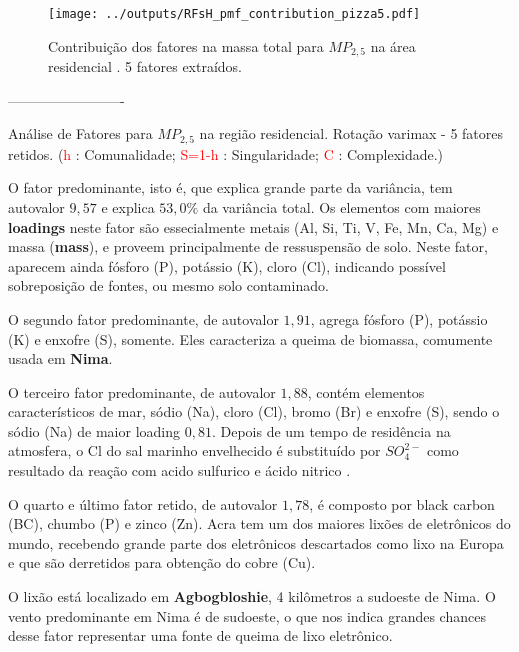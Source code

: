 \begin{figure}[H]
\centering
  \texttt{[image: ../outputs/RFsH\_pmf\_contribution\_pizza5.pdf]}
  \caption{Contribuição dos fatores na massa total para $MP_{2,5}$ na área
           residencial . 5 fatores extraídos.
          \label{table:RFsH_contribution5}}
\end{figure}

-------------------------

\begin{table}[H]
  \caption{Análise de Fatores para $MP_{2,5}$ na região residencial.
           Rotação varimax - 5 fatores retidos.
           (\textcolor{red}{h} : Comunalidade; 
           \textcolor{red}{S=1-h} : Singularidade; 
           \textcolor{red}{C} : Complexidade.)}
  
\end{table}

O fator predominante, isto é, que explica grande parte da variância, 
tem autovalor $9,57$ e explica $53,0\%$ da variância total.
Os elementos com maiores \textbf{loadings} neste fator são essecialmente 
metais (Al, Si, Ti, V, Fe, Mn, Ca, Mg) e massa (\textbf{mass}), e proveem 
principalmente de ressuspensão de solo.
Neste fator, aparecem ainda fósforo (P), potássio (K), cloro (Cl), indicando 
possível sobreposição de fontes, ou mesmo solo contaminado.

O segundo fator predominante, de autovalor $1,91$, agrega fósforo (P), 
potássio (K) e enxofre (S), somente. Eles caracteriza a queima de biomassa, 
comumente usada em \textbf{Nima}.

O terceiro fator predominante, de autovalor $1,88$, contém elementos
característicos de mar, sódio (Na), cloro (Cl), bromo (Br) e enxofre (S), 
sendo o sódio (Na) de maior loading $0,81$. 
Depois de um tempo de residência na atmosfera, o Cl do sal marinho envelhecido 
é substituído por $SO_4^{2-}$ como resultado da reação com acido sulfurico e 
ácido nitrico \citep{mcinnes1994}. 


O quarto e último fator retido, de autovalor $1,78$, é composto 
por black carbon (BC), chumbo (P) e zinco (Zn). 
Acra tem um dos maiores lixões de eletrônicos do mundo, recebendo
grande parte dos eletrônicos descartados como lixo na Europa e que são derretidos
para obtenção do cobre (Cu). 

O lixão está localizado em \textbf{Agbogbloshie}, 4 kilômetros a sudoeste de Nima. 
O vento predominante em Nima é de sudoeste, o que nos indica grandes chances 
desse fator representar uma fonte de queima de lixo eletrônico.

